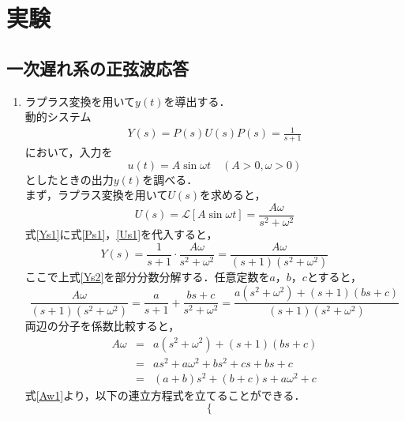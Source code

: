 \documentclass[a4paper,11pt]{jsarticle}
\begin{document}
\section{実験}
\subsection{一次遅れ系の正弦波応答}
\begin{enumerate}
  \item ラプラス変換を用いて$y(t)$を導出する．\cite{junbi2}\\
        動的システム\\
        \begin{eqnarray}
          Y(s) = P(s)U(s) \label{Ys1}
          P(s)=\frac{1}{s+1} \label{Ps1}
        \end{eqnarray}
        において，入力を\\
        \[u(t)=A\sin{\omega t} \quad (A>0, \omega>0)\]
        としたときの出力$y(t)$を調べる．\\
        まず，ラプラス変換を用いて$U(s)$を求めると，
        \begin{equation}
          U(s) = \mathcal{L}[A\sin{\omega t}] = \frac{A\omega}{s^2+\omega^2} \label{Us1}
        \end{equation}
        式\ref{Ys1}に式\ref{Ps1}，\ref{Us1}を代入すると，
        \begin{equation}
          Y(s) = \frac{1}{s+1}\cdot \frac{A\omega}{s^2+\omega^2}=\frac{A\omega}{(s+1)(s^2+\omega^2)} \label{Ys2}
        \end{equation}
        ここで上式\ref{Ys2}を部分分数分解する．任意定数を$a$，$b$，$c$とすると，
        \begin{equation}
          \frac{A\omega}{(s+1)(s^2+\omega^2)} = \frac{a}{s+1}+\frac{bs+c}{s^2+\omega^2}=\frac{a(s^2+\omega^2)+(s+1)(bs+c)}{(s+1)(s^2+\omega^2)}\nonumber
        \end{equation}
        両辺の分子を係数比較すると，
        \begin{eqnarray}
          A\omega &=& a(s^2+\omega^2)+(s+1)(bs+c)\\ \nonumber
          &=& as^2+a\omega^2+bs^2+cs+bs+c \\ \nonumber
          &=& (a+b)s^2 + (b+c)s + a\omega^2+c \label{Aw1}
        \end{eqnarray}
        式\ref{Aw1}より，以下の連立方程式を立てることができる．
        \begin{equation}
          \left\{ \,
          \begin{aligned}

\end{aligned}
\end{equation}
\end{enumerate}
\end{document}
